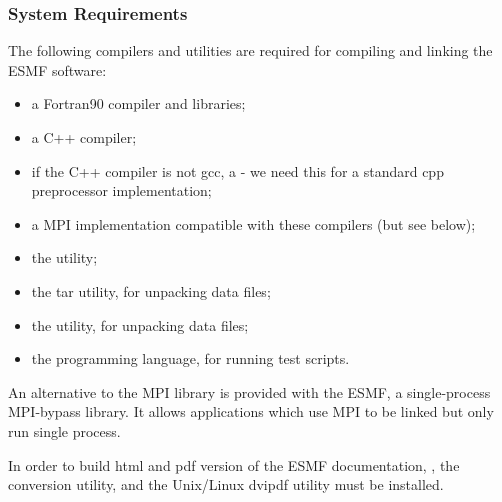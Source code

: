 
\subsubsection{System Requirements}
\label{sec:systemreq}

The following compilers and utilities are required for compiling and 
linking the ESMF software:
\begin{itemize}
\item a Fortran90 compiler and libraries;
\item a C++ compiler;
\item if the C++ compiler is not gcc, a  - we need this for a 
standard cpp preprocessor implementation;
\item a MPI implementation compatible with these compilers (but see below);
\item the  utility; 
\item the tar utility, for unpacking data files;
\item the  utility, for unpacking data files;
\item the  programming language, for running test scripts.
\end{itemize} 

An alternative to the MPI library is provided with the ESMF,
a single-process MPI-bypass library.  It allows applications which
use MPI to be linked but only run single process.

In order to build html and pdf version of the ESMF documentation, 
, the  conversion utility, and the Unix/Linux dvipdf utility must be installed.








